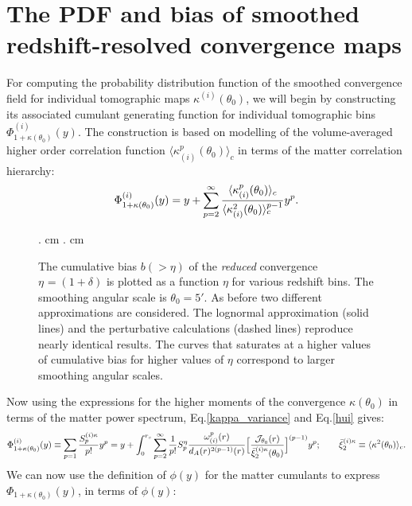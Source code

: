 \documentclass[usenatbib]{mn2e}
\def\la{\langle}
\def\ra{\rangle}
\def\exnew{{\cal J}_{\theta_0}(r)}
\def\avi{\bar\xi_2^{(i)\kappa}(\theta_0)}
\begin{document}
\section{ The PDF and bias of smoothed redshift-resolved convergence maps} 
\label{sec:pdf_bias}
For computing the probability distribution function of the smoothed 
convergence field for individual tomographic maps $\kappa^{(i)}(\theta_0)$, we will begin by constructing
its associated cumulant generating function for individual tomographic bins $\Phi^{(i)}_{1+\kappa(\theta_0)}(y)$.
The construction is based on modelling of the volume-averaged higher order correlation function $\langle
\kappa_{(i)}^p(\theta_0) \rangle_c$ in terms of the matter correlation hierarchy:
\begin{equation}
\Phi^{(i)}_{1 + {\kappa(\theta_0)}}(y) = y + \sum_{p=2}^ {\infty} {{\langle
\kappa_{(i)}^p(\theta_0) \rangle_c} \over \langle \kappa_{(i)}^2 (\theta_0 )
\rangle_c^{p-1}} y^p.
\end{equation}
%
\begin{figure}
\begin{center}
{. cm . cm {}}
\end{center}
\caption{The cumulative bias $b(>\eta)$ of the {\em reduced} convergence $\eta^{ }=(1+\delta)$ is plotted as a function $\eta$
for various redshift bins. The smoothing angular scale is $\theta_0=5'$. As before two different approximations are 
considered. The lognormal approximation (solid lines) and the perturbative calculations (dashed lines) reproduce 
nearly identical results. The curves that saturates at a higher values of cumulative bias for higher values of $\eta$ correspond
to larger smoothing angular scales. }
\label{fig:eta_bias}
\end{figure}
%
Now using the expressions for the higher moments of the convergence $\kappa(\theta_0)$
in terms of the matter power spectrum, Eq.\ref{kappa_variance} 
and Eq.\ref{hui} gives:
\begin{equation}
\Phi^{(i)}_{1 + {\kappa({\theta_0})}}(y) \equiv \sum_{p=1} {S^{(i)\kappa}_p \over p!}y^p   = y + \int_0^{r_s} \sum_{p=2}^{\infty}
{ 1 \over p!} S^{\eta}_p{\omega_{(i)}^p(r) \over d_A(r)^{2(p-1)} (r)}
\Big [ {\exnew \over\avi} \Big ]^{ (p-1)} y^p; \quad\quad \bar\xi_2^{(i)\kappa} \equiv \la \kappa^2(\theta_0)\ra_c .
\end{equation}
We can now use the definition of $\phi(y)$ for the matter cumulants to
express $\Phi_{1 + \kappa(\theta_0)}(y)$, in terms of $\phi(y)$:
\end{document}

